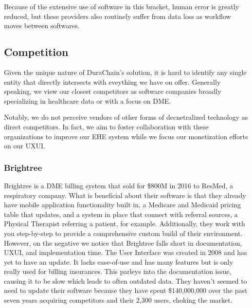 \documentclass[letterpaper]{article}
\begin{document}
  Because of the extensive use of software in this bracket, human error is greatly reduced, but these providers also routinely suffer from data loss as workflow moves between softwares.%

\subsection{Competition}
Given the unique nature of DuraChain's solution, it is hard to identify any single entity that directly intersects with eveything we have on offer. Generally speaking, we view our closest competitors as software companies broadly specializing in healthcare data or with a focus on DME.%

Notably, we do not perceive vendors of other forms of decnetralized technology as direct competitors. In fact, we aim to foster collaboration with these organizations to improve our EHE system while we focus our monetization efforts on our UXUI.%

  \subsubsection{Brightree}
  Brightree is a DME billing system that sold for \$800M in 2016 to ResMed, a respiratory company. What is beneficial about their software is that they already have mobile application functionality built in, a Medicare and Medicaid pricing table that updates, and a system in place that connect with referral sources, a Physical Therapist referring a patient, for example. Additionally, they work with you step-by-step to provide a comprehensive custom build of their environment.
%
  However, on the negative we notice that Brightree falls short in documentation, UXUI, and implementation time. The User Interface was created in 2008 and has yet to have an update. It lacks ease-of-use and has many features but is only really used for billing insurances. This parleys into the documentation issue, causing it to be slow which leads to often outdated data. They haven’t seemed to need to update their software because they have spent \$140,000,000 over the past seven years acquiring competitors and their 2,300 users, choking the market.
%
\end{document}
